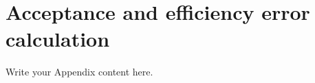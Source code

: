 
\chapter{Acceptance and efficiency error calculation} %

\label{AppendixB} %


Write your Appendix content here.
